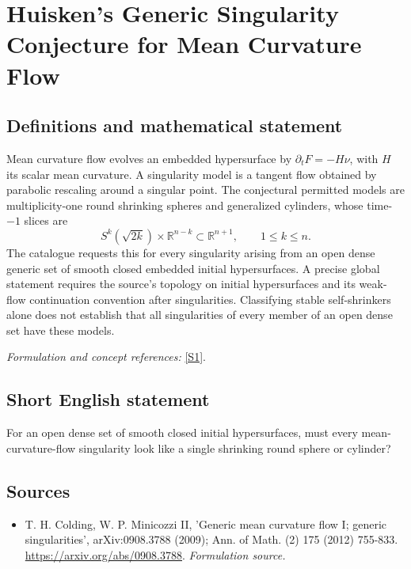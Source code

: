 \documentclass[11pt]{article}
\begin{document}
\section*{\texorpdfstring{Huisken's Generic Singularity Conjecture for Mean Curvature Flow}{Huisken's Generic Singularity Conjecture for Mean Curvature Flow}}\label{294}
\subsection{Definitions and mathematical statement}
Mean curvature flow evolves an embedded hypersurface by $\partial_tF=-H\nu$, with $H$ its scalar mean curvature. A singularity model is a tangent flow obtained by parabolic rescaling around a singular point. The conjectural permitted models are multiplicity-one round shrinking spheres and generalized cylinders, whose time-$-1$ slices are
\[
 S^k(\sqrt{2k})\times{\mathbb{R}}^{n-k}\subset{\mathbb{R}}^{n+1},\qquad1\le k\le n.
\]
The catalogue requests this for every singularity arising from an open dense generic set of smooth closed embedded initial hypersurfaces. A precise global statement requires the source's topology on initial hypersurfaces and its weak-flow continuation convention after singularities. Classifying stable self-shrinkers alone does not establish that all singularities of every member of an open dense set have these models.
\par\smallskip\textit{Formulation and concept references:} \href{https://arxiv.org/abs/0908.3788}{[S1]}.

\subsection{Short English statement}
For an open dense set of smooth closed initial hypersurfaces, must every mean-curvature-flow singularity look like a single shrinking round sphere or cylinder?
\subsection{Sources}
\begin{itemize}
\item[S1]T. H. Colding, W. P. Minicozzi II, 'Generic mean curvature flow I; generic singularities', arXiv:0908.3788 (2009); Ann. of Math. (2) 175 (2012) 755-833.
\url{https://arxiv.org/abs/0908.3788}.
\textit{Formulation source.}
\end{itemize}
\end{document}

